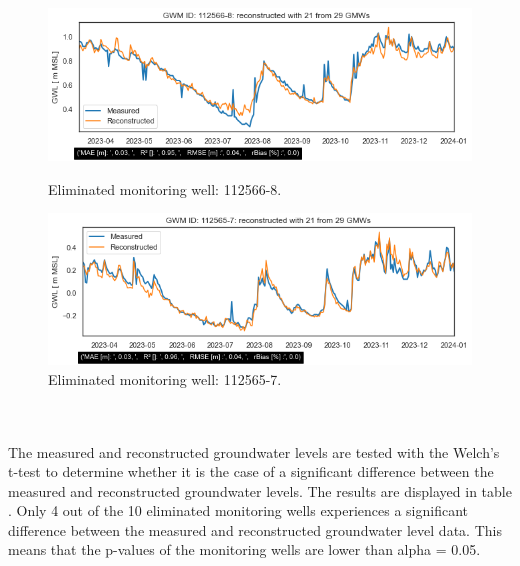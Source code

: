 \begin{figure}[h]
    \begin{minipage}{0.48\textwidth}
        \centering
        \includegraphics[width=\linewidth]{frontmatter/Rozenburg-fig/1125668.png}
        \caption{Eliminated monitoring well: 112566-8.}
        \label{112566-8}
    \end{minipage}\hfill
    \begin{minipage}{0.48\textwidth}
        \centering
        \includegraphics[width=\linewidth]{frontmatter/Rozenburg-fig/1125657.png}
        \caption{Eliminated monitoring well: 112565-7.}
        \label{roz8}
    \end{minipage}
\end{figure}\\
\\
The measured and reconstructed groundwater levels are tested with the Welch's t-test to determine whether it is the case of a significant difference between the measured and reconstructed groundwater levels. The results are displayed in table . Only 4 out of the 10 eliminated monitoring wells experiences a significant difference between the measured and reconstructed groundwater level data. This means that the p-values of the monitoring wells are lower than alpha = 0.05. 
